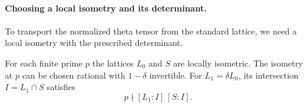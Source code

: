 \paragraph{Choosing a local isometry and its determinant.}

To transport the normalized theta tensor from the standard lattice, we need a local isometry with the prescribed determinant.

\begin{lemma}
\label{lem:cm-standard-local-isometry}
For each finite prime \(p\) the lattices \(L_0\) and \(S\) are
locally isometric. The isometry at \(p\) can be chosen rational
with \(1-\delta\) invertible. For \(L_1=\delta L_0\), its intersection \(I=L_1\cap S\) satisfies
\[
 p\nmid[L_1:I]\,[S:I].
\]

\end{lemma}

